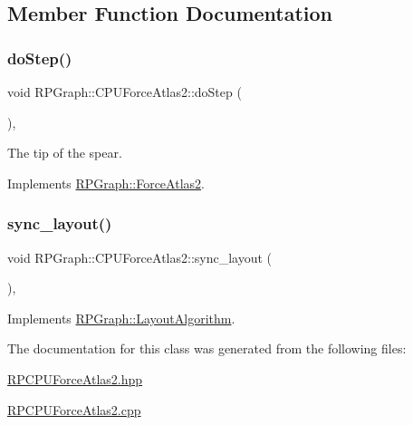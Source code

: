 \subsection{Member Function Documentation}
\mbox{\label{classRPGraph_1_1CPUForceAtlas2_a3542ecd2220173aabe4e864fc21826eb}} 
\subsubsection{\texorpdfstring{do\+Step()}{doStep()}}
{\footnotesize\ttfamily void R\+P\+Graph\+::\+C\+P\+U\+Force\+Atlas2\+::do\+Step (\begin{DoxyParamCaption}{ }\end{DoxyParamCaption})\hspace{0.3cm}{\ttfamily [override]}, {\ttfamily [virtual]}}

The tip of the spear. 

Implements \mbox{\hyperlink{classRPGraph_1_1ForceAtlas2_aa448ceec8292797a6e1b61ef8e2b3744}{R\+P\+Graph\+::\+Force\+Atlas2}}.

\mbox{\label{classRPGraph_1_1CPUForceAtlas2_afaada68053fce521843af0eb5ca316df}} 
\subsubsection{\texorpdfstring{sync\+\_\+layout()}{sync\_layout()}}
{\footnotesize\ttfamily void R\+P\+Graph\+::\+C\+P\+U\+Force\+Atlas2\+::sync\+\_\+layout (\begin{DoxyParamCaption}{ }\end{DoxyParamCaption})\hspace{0.3cm}{\ttfamily [override]}, {\ttfamily [virtual]}}



Implements \mbox{\hyperlink{classRPGraph_1_1LayoutAlgorithm_a70f3171d513b92d44f4784ff96c848c1}{R\+P\+Graph\+::\+Layout\+Algorithm}}.



The documentation for this class was generated from the following files\+:\begin{DoxyCompactItemize}
\item 
\mbox{\hyperlink{RPCPUForceAtlas2_8hpp}{R\+P\+C\+P\+U\+Force\+Atlas2.\+hpp}}\item 
\mbox{\hyperlink{RPCPUForceAtlas2_8cpp}{R\+P\+C\+P\+U\+Force\+Atlas2.\+cpp}}\end{DoxyCompactItemize}
